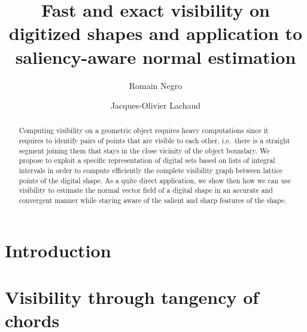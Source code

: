 \documentclass[runningheads]{llncs}
\begin{document}
%
    \title{Fast and exact visibility on digitized shapes and application to saliency-aware normal estimation}
%
%
    \author{Romain Negro \and
    Jacques-Olivier Lachaud}
%
%
%
    \maketitle              %
%
    \begin{abstract}
        Computing visibility on a geometric object requires heavy
        computations since it requires to identify pairs of points that
        are visible to each other, i.e.\ there is a straight segment
        joining them that stays in the close vicinity of the object
        boundary. We propose to exploit a specific representation of
        digital sets based on lists of integral intervals in order to
        compute efficiently the complete visibility graph between
        lattice points of the digital shape. As a quite direct
        application, we show then how we can use visibility to estimate
        the normal vector field of a digital shape in an accurate and
        convergent manner while staying aware of the salient and sharp features of
        the shape.

    \end{abstract}



    \section{Introduction}
    



    \section{Visibility through tangency of chords}
    
\end{document}

